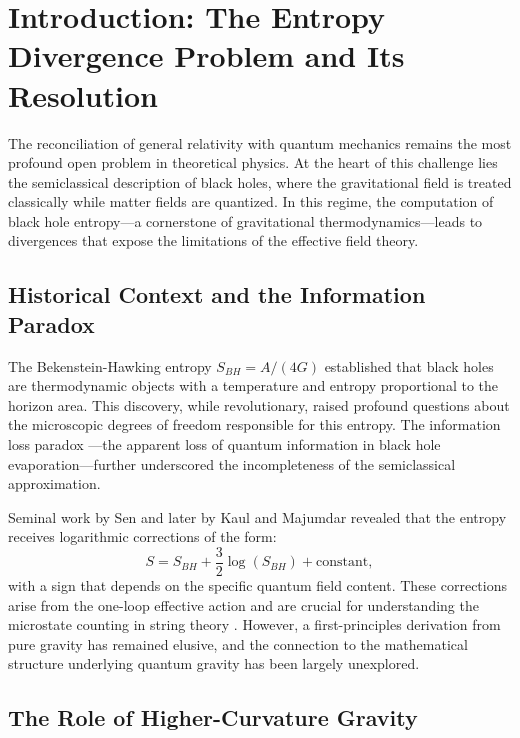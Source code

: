 \documentclass[%
 preprint,
 aps,
 prd,
 amsmath,amssymb,
 floatfix,
 longbibliography,
]{revtex4-2}
\begin{document}
\maketitle

\tableofcontents
\newpage
\section{Introduction: The Entropy Divergence Problem and Its Resolution}
\label{sec:introduction}

The reconciliation of general relativity with quantum mechanics remains the most profound open problem in theoretical physics. At the heart of this challenge lies the semiclassical description of black holes, where the gravitational field is treated classically while matter fields are quantized. In this regime, the computation of black hole entropy—a cornerstone of gravitational thermodynamics—leads to divergences that expose the limitations of the effective field theory.

\subsection{Historical Context and the Information Paradox}

The Bekenstein-Hawking entropy \(S_{BH} = A/(4G)\) \cite{Bekenstein1973, Hawking1975} established that black holes are thermodynamic objects with a temperature and entropy proportional to the horizon area. This discovery, while revolutionary, raised profound questions about the microscopic degrees of freedom responsible for this entropy. The information loss paradox \cite{Hawking1976} —the apparent loss of quantum information in black hole evaporation—further underscored the incompleteness of the semiclassical approximation.

Seminal work by Sen \cite{Sen1981} and later by Kaul and Majumdar \cite{KaulMajumdar2000} revealed that the entropy receives logarithmic corrections of the form:
\[
S = S_{BH} + \frac{3}{2}\log(S_{BH}) + \text{constant},
\]
with a sign that depends on the specific quantum field content. These corrections arise from the one-loop effective action and are crucial for understanding the microstate counting in string theory \cite{StromingerVafa1996}. However, a first-principles derivation from pure gravity has remained elusive, and the connection to the mathematical structure underlying quantum gravity has been largely unexplored.

\subsection{The Role of Higher-Curvature Gravity}
\end{document}
